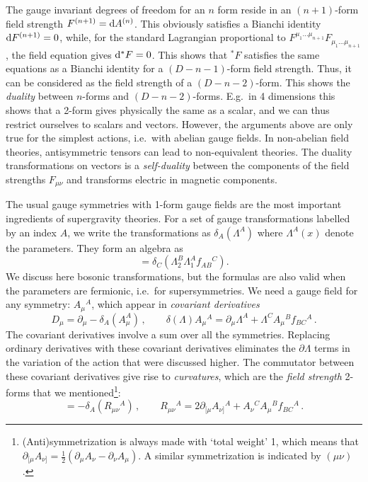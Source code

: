 \documentclass[a4paper,11pt,twoside]{article}
\newcommand{\Red}[1]{#1}
\newcommand{\OliveGreen}[1]{#1}
\newcommand{\RawSienna}[1]{#1}
\newcommand{\Blue}[1]{#1}
\newcommand{\ft}[2]{{\textstyle\frac{#1}{#2}}}
\def\rmd{{\rm d}}
\begin{document}
The gauge invariant degrees of freedom for an $n$ form reside in an
$(n+1)$-form field strength $F^{(n+1)}=\rmd A^{(n)}$. This obviously
satisfies a Bianchi identity $\rmd F^{(n+1)}=0$, while, for the standard
Lagrangian proportional to $F^{\mu _1\ldots \mu _{n+1}}F_{\mu _1\ldots
\mu _{n+1}}$,  the field equation gives $\rmd {}^*F=0$. This shows that
${}^* F$ satisfies the same equations as a Bianchi identity for a
$(D-n-1)$-form field strength. Thus, it can be considered as the field
strength of a $(D-n-2)$-form. This shows the \emph{duality} between
$n$-forms and $(D-n-2)$-forms. E.g.\ in 4 dimensions this shows that a
2-form gives physically the same as a scalar, and we can thus restrict
ourselves to scalars and vectors. However, the arguments above are only
true for the simplest actions, i.e.\ with abelian gauge fields. In
non-abelian field theories, antisymmetric tensors can lead to
non-equivalent theories. The duality transformations on vectors is a
\emph{self-duality} between the components of the field strengths $F_{\mu
\nu }$ and transforms electric in magnetic components.

The usual gauge symmetries with 1-form gauge fields are the most
important ingredients of supergravity theories. For a set of gauge
transformations labelled by an index $A$, we write the transformations as
$\delta_A (\Lambda ^A)$ where $\Lambda ^A(x)$ denote the parameters. They
form an algebra as
\begin{equation}
  [\delta_A( \OliveGreen{\Lambda_1^A}),\delta_B(\OliveGreen{\Lambda_2^B})] =\delta_C\left(
\OliveGreen{\Lambda_2^B\Lambda_1^A} \Red{f_{AB}{}^C}\right).
 \label{commutator}
\end{equation}
We discuss here bosonic transformations, but the formulas are also valid
when the parameters are fermionic, i.e.\ for supersymmetries. We need a
gauge field for any symmetry: $\Blue{A_\mu{}^A}$, which appear in
\emph{covariant derivatives}
\begin{equation}
 \RawSienna{D_\mu} =\partial _\mu -\delta_A(\Blue{A_\mu ^A})\,, \qquad
  \delta(\OliveGreen{\Lambda}) \Blue{A_\mu{}^A}=
\partial_\mu\OliveGreen{\Lambda^A} +\OliveGreen{\Lambda^C} \Blue{A_\mu{}^B} \Red{f_{BC}{}^A}\,.
 \label{covder}
\end{equation}
The covariant derivatives involve a sum over all the symmetries.
Replacing ordinary derivatives with these covariant derivatives
eliminates the $\partial \Lambda $ terms in the variation of the action
that were discussed higher. The commutator between these covariant
derivatives give rise to \emph{curvatures}, which are the \emph{field
strength} 2-forms that we mentioned\footnote{(Anti)symmetrization is
always made with `total weight' 1, which means that
$\partial_{[\mu}A_{\nu]}=\ft12\left(
\partial _\mu A_\nu -\partial _\nu A_\mu \right) $. A similar
symmetrization is indicated by $(\mu \nu )$.}:
\begin{equation}
  [\RawSienna{D_\mu},\RawSienna{D_\nu}]=-\delta _A(\RawSienna{R_{\mu \nu
  }{}^A})\,,\qquad
\RawSienna{R_{\mu\nu}{}^A} =
 2\partial_{[\mu}\Blue{A_{\nu]}}{}^A+ \Blue{A_\nu{}^C A_\mu{}^B}
 \Red{f_{BC}{}^A}\,.
 \label{curvatures}
\end{equation}
\end{document}
